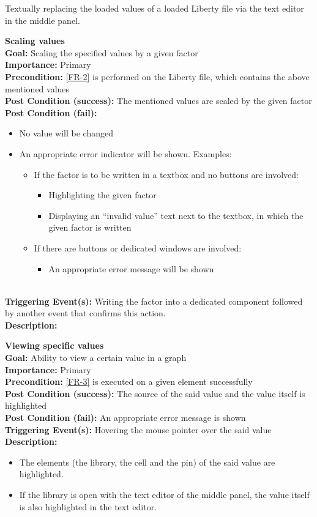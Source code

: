 \documentclass[10pt,a4paper]{report}
\newcommand{\FRDescription}[8]{
    \textbf{#1} \leavevmode \\
    \textbf{Goal: } #2 \leavevmode \\
    \textbf{Importance: } #3 \leavevmode \\
    \textbf{Precondition: } #4 \leavevmode \\
    \textbf{Post Condition (success): } #5 \leavevmode \\
    \textbf{Post Condition (fail): } #6 \leavevmode \\
    \textbf{Triggering Event(s): } #7 \leavevmode \\
    \textbf{Description: } \leavevmode \\ 
    #8}
\begin{document}
\begin{FR}
{    }
    {Textually replacing the loaded values of a loaded Liberty file via the text editor in the middle panel.}
    \item \FRDescription{Scaling values}
    {Scaling the specified values by a given factor}
    {Primary}
    {\ref{FR-2} is performed on the Liberty file, which contains the above mentioned values}
    {The mentioned values are scaled by the given factor}
    {\begin{itemize}
        \item No value will be changed
        \item An appropriate error indicator will be shown. Examples:
        \begin{itemize}
            \item If the factor is to be written in a textbox and no buttons are involved:
            \begin{itemize}
                \item Highlighting the given factor
                \item Displaying an “invalid value” text next to the textbox, in which the given factor is written
            \end{itemize}
            \item If there are buttons or dedicated windows are involved:
            \begin{itemize}
                \item An appropriate error message will be shown
            \end{itemize}
        \end{itemize}
    \end{itemize}}
    {Writing the factor into a dedicated component followed by another event that confirms this action.}
    \item \FRDescription{Viewing specific values}
    {Ability to view a certain value in a graph}
    {Primary}
    {\ref{FR-3} is executed on a given element successfully}
    {The source of the said value and the value itself is highlighted}
    {An appropriate error message is shown}
    {Hovering the mouse pointer over the said value}
    {\begin{itemize}
        \item The elements (the library, the cell and the pin) of the said value are highlighted.
        \item If the library is open with the text editor of the middle panel, the value itself is also highlighted in the text editor.
    \end{itemize}}

\end{FR}
\end{document}
